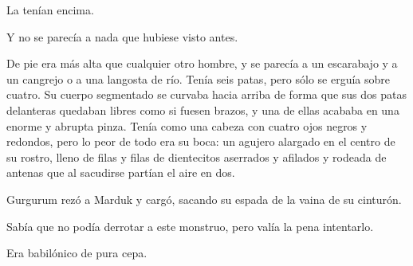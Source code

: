 La tenían encima.

Y no se parecía a nada que hubiese visto antes.

De pie era más alta que cualquier otro hombre, y se parecía a un
escarabajo y a un cangrejo o a una langosta de río. Tenía seis patas,
pero sólo se erguía sobre cuatro. Su cuerpo segmentado se curvaba hacia
arriba de forma que sus dos patas delanteras quedaban libres como si
fuesen brazos, y una de ellas acababa en una enorme y abrupta pinza.
Tenía como una cabeza con cuatro ojos negros y redondos, pero lo peor de
todo era su boca: un agujero alargado en el centro de su rostro, lleno
de filas y filas de dientecitos aserrados y afilados y rodeada de
antenas que al sacudirse partían el aire en dos.

Gurgurum rezó a Marduk y cargó, sacando su espada de la vaina de su
cinturón.

Sabía que no podía derrotar a este monstruo, pero valía la pena
intentarlo.

Era babilónico de pura cepa.
